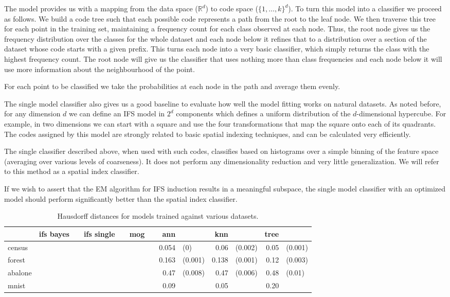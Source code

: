 \documentclass[10pt,a4paper,oneside]{article}
\theoremstyle{definition}
\begin{document}
The model provides us with a mapping from the data space (${\mathbb R}^d$) to code space ($\{1, \ldots, k\}^d$). To turn this model into a classifier we proceed as follows. We build a code tree such that each possible code represents a path from the root to the leaf node. We then traverse this tree for each point in the training set, maintaining a frequency count for each class observed at each node. Thus, the root node gives us the frequency distribution over the classes for the whole dataset and each node below it refines that to a distribution over a section of the dataset whose code starts with a given prefix. This turns each node into a very basic classifier, which simply returns the class with the highest frequency count. The root node will give us the classifier that uses nothing more than class frequencies and each node below it will use more information about the neighbourhood of the point.

For each point to be classified we take the probabilities at each node in the path and average them evenly. 

The single model classifier also gives us a good baseline to evaluate how well the model fitting works on natural datasets. As noted before, for any dimension $d$ we can define an IFS model in $2^d$ components which defines a uniform distribution of the $d$-dimensional hypercube. For example, in two dimensions we can start with a square and use the four transformations that map the square onto each of its quadrants. The codes assigned by this model are strongly related to basic spatial indexing techniques, and can be calculated very efficiently. 

The single classifier described above, when used with such codes, classifies based on histograms over a simple binning of the feature space (averaging over various levels of coarseness). It does not perform any dimensionality reduction and very little generalization. We will refer to this method as a spatial index classifier.

If we wish to assert that the EM algorithm for IFS induction results in a meaningful subspace, the single model classifier with an optimized model should perform significantly better than the spatial index classifier. 
 
\begin{table}[h]
\begin{tabular}{| l | r l r l | r l r l  r l r l |}
\hline
  & ifs bayes & & ifs single & & mog & & ann & & knn & & tree & \\
\hline
census  & & & & & & & 0.054 &\color{gray}(0) & 0.06 & \color{gray} (0.002) & 0.05 & \color{gray} (0.001) \\
forest  & & & & & & & 0.163 &\color{gray}(0.001) & 0.138 &\color{gray}(0.001) & 0.12&\color{gray}(0.003) \\
abalone & & & & & & & 0.47 & \color{gray}(0.008) & 0.47 & \color{gray}(0.006) & 0.48 & \color{gray}(0.01) \\
mnist   & & & & & & & 0.09 & & 0.05 & & 0.20 & \\
\hline

\end{tabular}
\caption{Hausdorff distances for models trained against various datasets.}
\label{classification-results}
\end{table}
\end{document}
